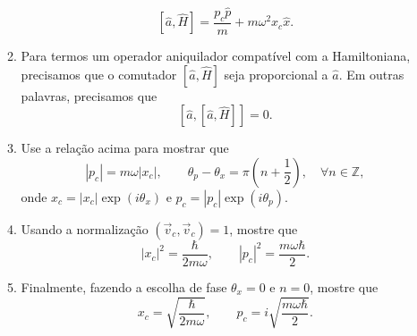 \begin{enumerate}
\begin{enumerate}
                    $$[\hat{a},\hat{H}] = \frac{p_c\hat{p}}{m}+m\omega^2x_c\hat{x}.$$
              \item Para termos um operador aniquilador compatível com a Hamiltoniana,
                    precisamos que o comutador $[\hat{a},\hat{H}]$ seja proporcional a
                    $\hat{a}$. Em outras palavras, precisamos que
                    $$[\hat{a}, [\hat{a},\hat{H}]] = 0.$$
              \item Use a relação acima para mostrar que
                    $$|p_c| = m\omega|x_c|,\qquad \theta_p - \theta_x = \pi\left(n+\frac{1}{2}\right),
                        \quad \forall n \in \mathbb{Z},$$
                    onde $x_c = |x_c|\exp(i\theta_x)$ e $p_c = |p_c|\exp(i\theta_p)$.
              \item Usando a normalização $\left(\vec{v}_c, \vec{v}_c\right) = 1$, mostre que
                    $$|x_c|^2 = \frac{\hbar}{2m\omega},\qquad |p_c|^2 = \frac{m\omega\hbar}{2}.$$
              \item Finalmente, fazendo a escolha de fase $\theta_x = 0$ e $n=0$, mostre que
                    $$x_c = \sqrt{\frac{\hbar}{2m\omega}},\qquad p_c = i\sqrt{\frac{m\omega\hbar}{2}}.$$
          \end{enumerate}
\end{enumerate}

